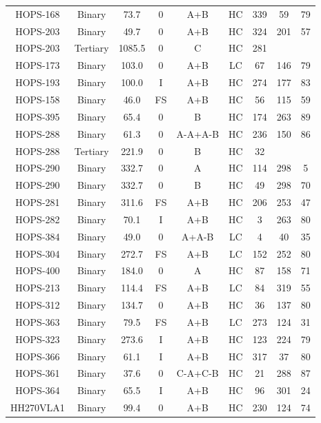 \begin{deluxetable}
\begin{tabular}{ccccccccc}
HOPS-168 & Binary & 73.7 & 0 & A+B & HC & 339 & 59 & 79 \\
HOPS-203 & Binary & 49.7 & 0 & A+B & HC & 324 & 201 & 57 \\
HOPS-203 & Tertiary & 1085.5 & 0 & C & HC & 281 & \nodata & \nodata \\
HOPS-173 & Binary & 103.0 & 0 & A+B & LC & 67 & 146 & 79 \\
HOPS-193 & Binary & 100.0 & I & A+B & HC & 274 & 177 & 83 \\
HOPS-158 & Binary & 46.0 & FS & A+B & HC & 56 & 115 & 59 \\
HOPS-395 & Binary & 65.4 & 0 & B & HC & 174 & 263 & 89 \\
HOPS-288 & Binary & 61.3 & 0 & A-A+A-B & HC & 236 & 150 & 86 \\
HOPS-288 & Tertiary & 221.9 & 0 & B & HC & 32 & \nodata & \nodata \\
HOPS-290 & Binary & 332.7 & 0 & A & HC & 114 & 298 & 5 \\
HOPS-290 & Binary & 332.7 & 0 & B & HC & 49 & 298 & 70 \\
HOPS-281 & Binary & 311.6 & FS & A+B & HC & 206 & 253 & 47 \\
HOPS-282 & Binary & 70.1 & I & A+B & HC & 3 & 263 & 80 \\
HOPS-384 & Binary & 49.0 & 0 & A+A-B & LC & 4 & 40 & 35 \\
HOPS-304 & Binary & 272.7 & FS & A+B & LC & 152 & 252 & 80 \\
HOPS-400 & Binary & 184.0 & 0 & A & HC & 87 & 158 & 71 \\
HOPS-213 & Binary & 114.4 & FS & A+B & LC & 84 & 319 & 55 \\
HOPS-312 & Binary & 134.7 & 0 & A+B & HC & 36 & 137 & 80 \\
HOPS-363 & Binary & 79.5 & FS & A+B & LC & 273 & 124 & 31 \\
HOPS-323 & Binary & 273.6 & I & A+B & HC & 123 & 224 & 79 \\
HOPS-366 & Binary & 61.1 & I & A+B & HC & 317 & 37 & 80 \\
HOPS-361 & Binary & 37.6 & 0 & C-A+C-B & HC & 21 & 288 & 87 \\
HOPS-364 & Binary & 65.5 & I & A+B & HC & 96 & 301 & 24 \\
HH270VLA1 & Binary & 99.4 & 0 & A+B & HC & 230 & 124 & 74 \\
\end{tabular}
\end{deluxetable}
